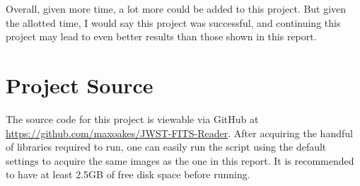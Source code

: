 \documentclass[10pt,twocolumn,letterpaper]{article}
\begin{document}
Overall, given more time, a lot more could be added to this project. But given the allotted time, I would say this project was successful, and continuing this project may lead to even better results than those shown in this report.

\section{Project Source}
\label{sec:source}

The source code for this project is viewable via GitHub at \url{https://github.com/maxoakes/JWST-FITS-Reader}. After acquiring the handful of libraries required to run, one can easily run the script using the default settings to acquire the same images as the one in this report. It is recommended to have at least 2.5GB of free disk space before running.
\end{document}

